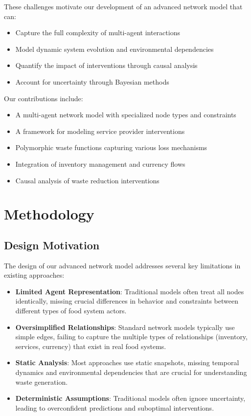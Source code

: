 \documentclass[12pt]{article}
\theoremstyle{definition}
\begin{document}
These challenges motivate our development of an advanced network model that can:
\begin{itemize}
    \item Capture the full complexity of multi-agent interactions
    \item Model dynamic system evolution and environmental dependencies
    \item Quantify the impact of interventions through causal analysis
    \item Account for uncertainty through Bayesian methods
\end{itemize}

Our contributions include:
\begin{itemize}
    \item A multi-agent network model with specialized node types and constraints
    \item A framework for modeling service provider interventions
    \item Polymorphic waste functions capturing various loss mechanisms
    \item Integration of inventory management and currency flows
    \item Causal analysis of waste reduction interventions
\end{itemize}

\section{Methodology}
\subsection{Design Motivation}
The design of our advanced network model addresses several key limitations in existing approaches:

\begin{itemize}
    \item \textbf{Limited Agent Representation}: Traditional models often treat all nodes identically, missing crucial differences in behavior and constraints between different types of food system actors.
    
    \item \textbf{Oversimplified Relationships}: Standard network models typically use simple edges, failing to capture the multiple types of relationships (inventory, services, currency) that exist in real food systems.
    
    \item \textbf{Static Analysis}: Most approaches use static snapshots, missing temporal dynamics and environmental dependencies that are crucial for understanding waste generation.
    
    \item \textbf{Deterministic Assumptions}: Traditional models often ignore uncertainty, leading to overconfident predictions and suboptimal interventions.
\end{itemize}
\end{document}
